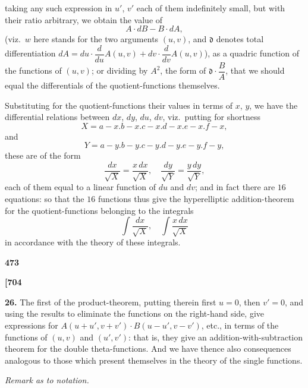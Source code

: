 \documentclass[12pt,a4paper]{article}
\theoremstyle{definition}
\begin{document}
taking any such expression in $u'$, $v'$ each of them indefinitely small, but with their ratio arbitrary, we obtain the value of
\[
A \cdot dB - B \cdot dA,
\]
(viz.\ $w$ here stands for the two arguments $(u, v)$, and $\mathfrak{d}$ denotes total differentiation $dA = du \cdot \dfrac{d}{du}A(u, v) + dv \cdot \dfrac{d}{dv}A(u, v)$), as a quadric function of the functions of $(u, v)$; or dividing by $A^2$, the form of $\mathfrak{d} \cdot \dfrac{B}{A}$, that we should equal the differentials of the quotient-functions themselves.

Substituting for the quotient-functions their values in terms of $x$, $y$, we have the differential relations between $dx$, $dy$, $du$, $dv$, viz.\ putting for shortness
\[
X = a - x . b - x . c - x . d - x . e - x . f - x,
\]
and
\[
Y = a - y . b - y . c - y . d - y . e - y . f - y,
\]
these are of the form
\[
\frac{dx}{\sqrt{X}} = \frac{x\,dx}{\sqrt{X}},\quad \frac{dy}{\sqrt{Y}} = \frac{y\,dy}{\sqrt{Y}},
\]
each of them equal to a linear function of $du$ and $dv$; and in fact there are $16$ equations: so that the $16$ functions thus give the hyperelliptic addition-theorem for the quotient-functions belonging to the integrals
\[
\int \frac{dx}{\sqrt{X}},\quad \int \frac{x\,dx}{\sqrt{X}}
\]
in accordance with the theory of these integrals.

\vspace{1em}

\begin{center}
\textbf{473}
\end{center}

\vspace{0.5em}

\noindent\textbf{[704}

\vspace{0.5em}

\noindent\textbf{26.}\quad
The first of the product-theorem, putting therein first $u = 0$, then $v' = 0$, and using the results to eliminate the functions on the right-hand side, give expressions for $A(u + u', v + v') \cdot B(u - u', v - v')$, etc., in terms of the functions of $(u, v)$ and $(u', v')$: that is, they give an addition-with-subtraction theorem for the double theta-functions. And we have thence also consequences analogous to those which present themselves in the theory of the single functions.

\vspace{1em}

\begin{center}
\textit{Remark as to notation.}
\end{center}
\end{document}
